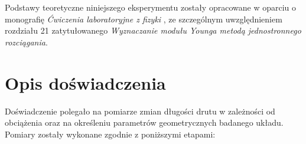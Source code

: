 \documentclass[a4paper,12pt]{article}
\begin{document}
Podstawy teoretyczne niniejszego eksperymentu zostały opracowane w oparciu o monografię \textit{Ćwiczenia laboratoryjne z fizyki} \cite{Drynski1976}, ze szczególnym uwzględnieniem rozdziału 21 zatytułowanego \textit{Wyznaczanie modułu Younga metodą jednostronnego rozciągania}.



\section{Opis doświadczenia}

Doświadczenie polegało na pomiarze zmian długości drutu w zależności od obciążenia oraz na określeniu parametrów geometrycznych badanego układu. Pomiary zostały wykonane zgodnie z poniższymi etapami:
\end{document}
